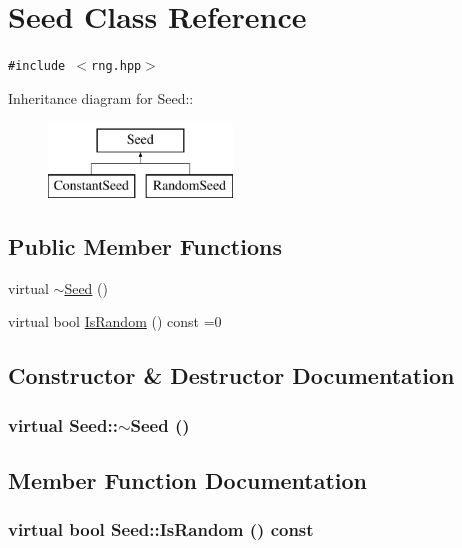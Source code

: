 \hypertarget{classSeed}{
\section{Seed Class Reference}
\label{classSeed}
}
{\tt \#include $<$rng.hpp$>$}

Inheritance diagram for Seed::\begin{figure}[H]
\begin{center}
\leavevmode
\includegraphics[height=2cm]{classSeed}
\end{center}
\end{figure}
\subsection*{Public Member Functions}
\begin{CompactItemize}
\item 
virtual \hyperlink{classSeed_8a70c7c054dee5eda3033f3d152ebdfa}{$\sim$Seed} ()
\item 
virtual bool \hyperlink{classSeed_d07ddf0065c61a3dea72238a93e2bb35}{IsRandom} () const =0
\end{CompactItemize}


\subsection{Constructor \& Destructor Documentation}
\hypertarget{classSeed_8a70c7c054dee5eda3033f3d152ebdfa}{
\subsubsection[{$\sim$Seed}]{\setlength{\rightskip}{0pt plus 5cm}virtual Seed::$\sim$Seed ()}}
\label{classSeed_8a70c7c054dee5eda3033f3d152ebdfa}




\subsection{Member Function Documentation}
\hypertarget{classSeed_d07ddf0065c61a3dea72238a93e2bb35}{
\subsubsection[{IsRandom}]{\setlength{\rightskip}{0pt plus 5cm}virtual bool Seed::IsRandom () const}}
\label{classSeed_d07ddf0065c61a3dea72238a93e2bb35}




